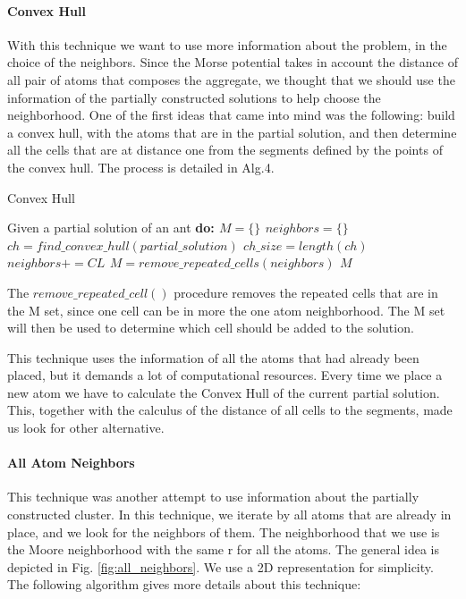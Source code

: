 			\paragraph*{Convex Hull}
			With this technique we want to use more information about the problem, in the choice of the neighbors. Since the Morse potential takes in account the distance of all pair of atoms that composes the aggregate, we thought that we should use the information of the partially constructed solutions to help choose the neighborhood. One of the first ideas that came into mind was the following: build a convex hull, with the atoms that are in the partial solution, and then determine all the cells that are at distance one from the segments defined by the points of the convex hull. The process is detailed in Alg.4.
			\begin{algorithm}
				\caption{Convex Hull}
				\label{alg:convex_hull}
				\begin{algorithmic}
				\STATE Given a partial solution of an ant \bf{do}:
				\STATE $M = \{\}$
				\STATE $neighbors = \{\}$
				\STATE $ch = find\_convex\_hull(partial\_solution)$
				\STATE $ch\_size = length(ch)$
							\STATE $neighbors += CL$
						\ENDIF
					\ENDFOR
				\ENDFOR
				\STATE $M = remove\_repeated\_cells(neighbors)$
				\RETURN $M$
				\end{algorithmic}
			\end{algorithm}
			
			The $remove\_repeated\_cell()$ procedure removes the repeated cells that are in the M set, since one cell can be in more the one atom neighborhood.
			The M set will then be used to determine which cell should be added to the solution.

			This technique uses the information of all the atoms that had already been placed, but it demands a lot of computational resources. Every time we place a new atom we have to calculate the Convex Hull of the current partial solution. This, together with the calculus of the distance of all cells to the segments, made us look for other alternative.
			
			\paragraph*{All Atom Neighbors}
			This technique was another attempt to use information about the partially constructed cluster.  In this technique, we iterate by all atoms that are already in place, and we look for the neighbors of them. The neighborhood that we use is the Moore neighborhood with the same r for all the atoms. The general idea is depicted in Fig. \ref{fig:all_neighbors}. We use a 2D representation for simplicity. The following algorithm gives more details about this technique:
		
